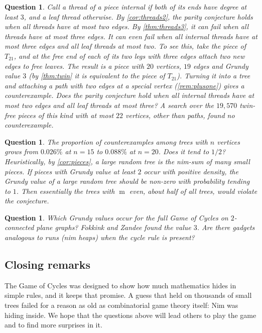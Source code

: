 \documentclass[11pt]{amsart}
\newtheorem{question}[theorem]{Question}
\theoremstyle{definition}
\theoremstyle{remark}
\newcommand{\m}{\operatorname{m}}
\begin{document}
\begin{question}
Call a thread of a piece \emph{internal} if both of its ends have degree at least $3$, and a \emph{leaf thread} otherwise. By \cref{cor:threads2}, the parity conjecture holds when all threads have at most two edges. By \cref{thm:threads3}, it can fail when all threads have at most three edges. It can even fail when all internal threads have at most three edges and all leaf threads at most two. To see this, take the piece of $T_{21}$, and at the free end of each of its two legs with three edges attach two new edges to free leaves. The result is a piece with $20$ vertices, $19$ edges and Grundy value $3$ (by \cref{thm:twin} it is equivalent to the piece of $T_{21}$). Turning it into a tree and attaching a path with two edges at a special vertex (\cref{rem:plusone}) gives a counterexample. Does the parity conjecture hold when all internal threads have at most two edges and all leaf threads at most three? A search over the $19{,}570$ twin-free pieces of this kind with at most $22$ vertices, other than paths, found no counterexample.
\end{question}

\begin{question}
The proportion of counterexamples among trees with $n$ vertices grows from $0.026\%$ at $n=15$ to $0.088\%$ at $n=20$. Does it tend to $1/2$? Heuristically, by \cref{cor:pieces}, a large random tree is the nim-sum of many small pieces. If pieces with Grundy value at least $2$ occur with positive density, the Grundy value of a large random tree should be non-zero with probability tending to $1$. Then essentially the trees with $\m$ even, about half of all trees, would violate the conjecture.
\end{question}

\begin{question}
Which Grundy values occur for the full Game of Cycles on $2$-connected plane graphs? Fokkink and Zandee found the value $3$. Are there gadgets analogous to runs (nim heaps) when the cycle rule is present?
\end{question}

\subsection*{Closing remarks}
The Game of Cycles was designed to show how much mathematics hides in simple rules, and it keeps that promise. A guess that held on thousands of small trees failed for a reason as old as combinatorial game theory itself: Nim was hiding inside. We hope that the questions above will lead others to play the game and to find more surprises in it.
\end{document}
